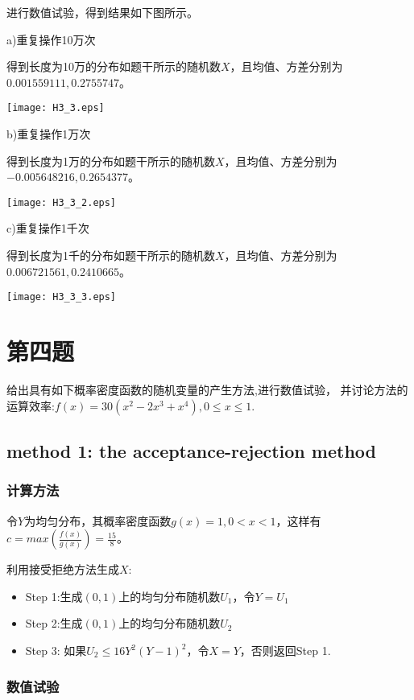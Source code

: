 \documentclass{ctexart}
\begin{document}
进行数值试验，得到结果如下图所示。

a)重复操作10万次

得到长度为10万的分布如题干所示的随机数\(X\)，且均值、方差分别为\(0.001559111,0.2755747\)。

\centerline{\texttt{[image: H3\_3.eps]}}

b)重复操作1万次

得到长度为1万的分布如题干所示的随机数\(X\)，且均值、方差分别为\(-0.005648216,0.2654377\)。

\centerline{\texttt{[image: H3\_3\_2.eps]}}

c)重复操作1千次

得到长度为1千的分布如题干所示的随机数\(X\)，且均值、方差分别为\(0.006721561,0.2410665\)。

\centerline{\texttt{[image: H3\_3\_3.eps]}}





\section{第四题}  

给出具有如下概率密度函数的随机变量的产生方法,进行数值试验， 并讨论方法的运算效率:\(f(x) =30(x^2−2x^3+x^4),0 \leq x\leq1\).

\subsection{method 1: the acceptance-rejection method}


\subsubsection{计算方法}

令\(Y\)为均匀分布，其概率密度函数\(g(x)=1,  0<x<1\)，这样有\(c= max (\frac{f(x)}{g(x)})=\frac{15}{8}\)。

利用接受拒绝方法生成\(X\):
\begin{itemize} 
\item Step 1:生成\((0,1)\)上的均匀分布随机数\(U_1\)，令\(Y=U_1\)
\item Step 2:生成\((0,1)\)上的均匀分布随机数\(U_2\)
\item Step 3: 如果\(U_2 \leq 16 Y^2(Y-1)^2\)，令\(X=Y\)，否则返回Step 1.
\end{itemize}

\subsubsection{数值试验}
\end{document}
